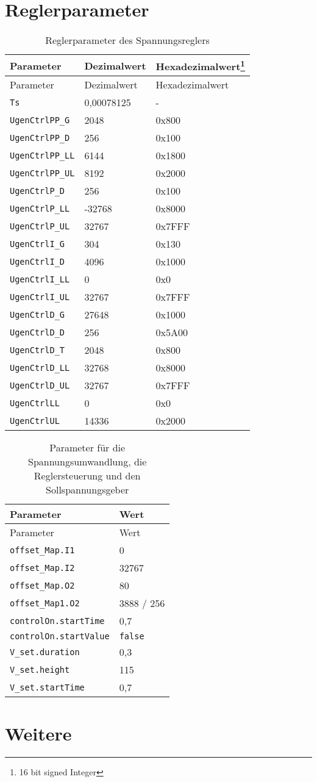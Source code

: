 \hypertarget{reglerparameter}{%
\section{Reglerparameter}\label{reglerparameter}}

\begin{longtable}[]{@{}lll@{}}
\caption{Reglerparameter des Spannungsreglers}\tabularnewline
\toprule
Parameter & Dezimalwert & Hexadezimalwert\footnote{16 bit signed Integer}\tabularnewline
\midrule
\endfirsthead
\toprule
Parameter & Dezimalwert & Hexadezimalwert{}\tabularnewline
\midrule
\endhead
\texttt{Ts} & 0,00078125 & -\tabularnewline
\texttt{UgenCtrlPP\_G} & 2048 & 0x800\tabularnewline
\texttt{UgenCtrlPP\_D} & 256 & 0x100\tabularnewline
\texttt{UgenCtrlPP\_LL} & 6144 & 0x1800\tabularnewline
\texttt{UgenCtrlPP\_UL} & 8192 & 0x2000\tabularnewline
\texttt{UgenCtrlP\_D} & 256 & 0x100\tabularnewline
\texttt{UgenCtrlP\_LL} & -32768 & 0x8000\tabularnewline
\texttt{UgenCtrlP\_UL} & 32767 & 0x7FFF\tabularnewline
\texttt{UgenCtrlI\_G} & 304 & 0x130\tabularnewline
\texttt{UgenCtrlI\_D} & 4096 & 0x1000\tabularnewline
\texttt{UgenCtrlI\_LL} & 0 & 0x0\tabularnewline
\texttt{UgenCtrlI\_UL} & 32767 & 0x7FFF\tabularnewline
\texttt{UgenCtrlD\_G} & 27648 & 0x1000\tabularnewline
\texttt{UgenCtrlD\_D} & 256 & 0x5A00\tabularnewline
\texttt{UgenCtrlD\_T} & 2048 & 0x800\tabularnewline
\texttt{UgenCtrlD\_LL} & 32768 & 0x8000\tabularnewline
\texttt{UgenCtrlD\_UL} & 32767 & 0x7FFF\tabularnewline
\texttt{UgenCtrlLL} & 0 & 0x0\tabularnewline
\texttt{UgenCtrlUL} & 14336 & 0x2000\tabularnewline
\bottomrule
\end{longtable}

\begin{longtable}[]{@{}ll@{}}
\caption{Parameter für die Spannungsumwandlung, die Reglersteuerung und
den Sollspannungsgeber}\tabularnewline
\toprule
Parameter & Wert\tabularnewline
\midrule
\endfirsthead
\toprule
Parameter & Wert\tabularnewline
\midrule
\endhead
\texttt{offset\_Map.I1} & 0\tabularnewline
\texttt{offset\_Map.I2} & 32767\tabularnewline
\texttt{offset\_Map.O2} & 80\tabularnewline
\texttt{offset\_Map1.O2} & 3888 / 256\tabularnewline
\texttt{controlOn.startTime} & 0,7\tabularnewline
\texttt{controlOn.startValue} & \texttt{false}\tabularnewline
\texttt{V\_set.duration} & 0,3\tabularnewline
\texttt{V\_set.height} & 115\tabularnewline
\texttt{V\_set.startTime} & 0,7\tabularnewline
\bottomrule
\end{longtable}

\hypertarget{weitere}{%
\section{Weitere}\label{weitere}}

